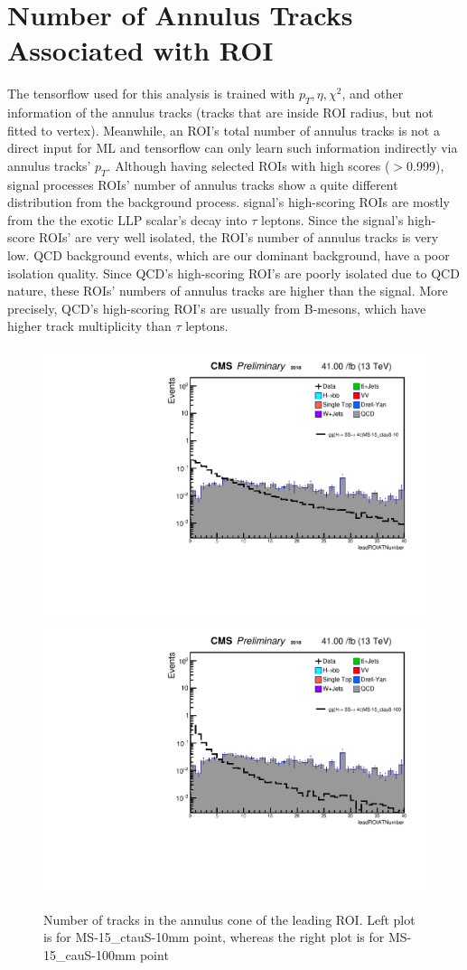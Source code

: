 \section{Number of Annulus Tracks Associated with ROI}\label{ref:NumAnnulus}
 The tensorflow used for this analysis is trained with $p_T, \eta, \chi^{2}$, and other information of the annulus tracks (tracks that are inside ROI radius, but not fitted to vertex).
Meanwhile, an ROI's total number of annulus tracks is not a direct input for ML and tensorflow can only learn such information indirectly via annulus tracks' $p_T$.
Although having selected ROIs with high scores ($>$0.999), signal processes ROIs' number of annulus tracks show a quite different distribution from the background process.
signal's high-scoring ROIs are mostly from the the exotic LLP scalar's decay into $\tau$ leptons. 
Since the signal's high-score ROIs' are very well isolated, the ROI's number of annulus tracks is very low.
QCD background events, which are our dominant background, have a poor isolation quality.
Since QCD's high-scoring ROI's are poorly isolated due to QCD nature, these ROIs' numbers of annulus tracks are higher than the signal.
More precisely, QCD's high-scoring ROI's are usually from B-mesons, which have higher track multiplicity than $\tau$ leptons.


 \begin{figure}[h!]
   \caption{Number of tracks in the annulus cone of the leading ROI. Left plot is for MS-15\_ctauS-10mm point, whereas the right plot is for MS-15\_cauS-100mm point}
   \label{fig:ANleadSize}
   \centering
   \includegraphics[width=0.47\linewidth]{figs/AnalysisNoteplot_MS-15_ctauS-10_leadROIATNumber.pdf}
   \includegraphics[width=0.47\linewidth]{figs/AnalysisNoteplot_MS-15_ctauS-100_leadROIATNumber.pdf}
 \end{figure}





